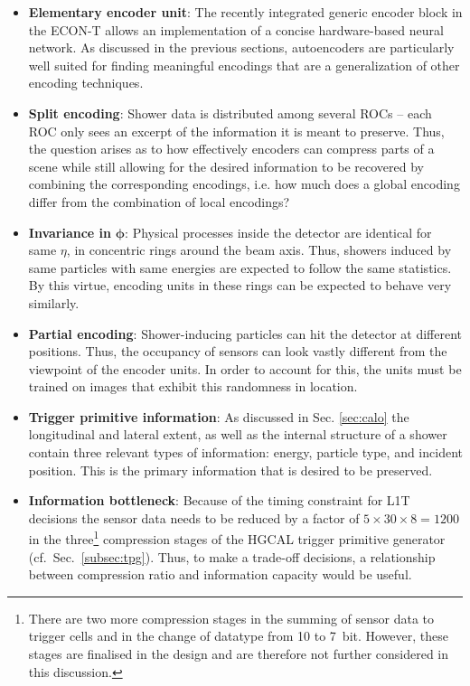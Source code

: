 \documentclass[../../main.tex]{subfiles}
\begin{document}
\begin{itemize}
	\item \textbf {Elementary encoder unit}: The recently integrated generic encoder block in the ECON-T allows an implementation of a concise hardware-based neural network. As discussed in the previous sections, autoencoders are particularly well suited for finding meaningful encodings that are a generalization of other encoding techniques.
	\item \textbf{Split encoding}: Shower data is distributed among several ROCs -- each ROC only sees an excerpt of the information it is meant to preserve. Thus, the question arises as to how effectively encoders can compress parts of a scene while still allowing for the desired information to be recovered by combining the corresponding encodings, i.e. how much does a global encoding differ from the combination of local encodings?
	\item \textbf{Invariance in }$\bm{\phi}$: Physical processes inside the detector are identical for same $\eta$, in concentric rings around the beam axis. Thus, showers induced by same particles with same energies are expected to follow the same statistics. By this virtue, encoding units in these rings can be expected to behave very similarly.
	\item \textbf{Partial encoding}: Shower-inducing particles can hit the detector at different positions. Thus, the occupancy of sensors can look vastly different from the viewpoint of the encoder units. In order to account for this, the units must be trained on images that exhibit this randomness in location.
	\item \textbf{Trigger primitive information}: As discussed in Sec. \ref{sec:calo} the longitudinal and lateral extent, as well as the internal structure of a shower contain three relevant types of information: energy, particle type, and incident position. This is the primary information that is desired to be preserved.
	\item \textbf{Information bottleneck}: Because of the timing constraint for L1T decisions the sensor data needs to be reduced by a factor of $5\times 30\times 8=1200$ in the three\footnote{There are two more compression stages in the summing of sensor data to trigger cells and in the change of datatype from 10 to \SI{7}{bit}. However, these stages are finalised in the design and are therefore not further considered in this discussion.} compression stages of the HGCAL trigger primitive generator (cf.~Sec.~\ref{subsec:tpg}). Thus, to make a trade-off decisions, a relationship between compression ratio and information capacity would be useful.
\end{itemize}
\end{document}
